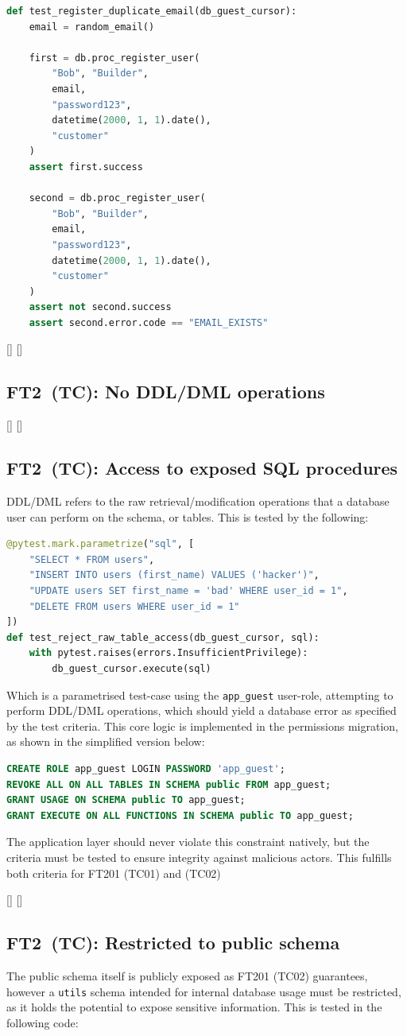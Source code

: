 \documentclass[journal]{IEEEtran}
\newcommand{\testcase}[4]{%
	\StrRight{00#2}{2}[\paddedminor]%
	\StrRight{00#3}{2}[\paddedid]%
	\vspace{-.5em}%
	\subsection*{\textsc{FT#1\paddedminor~(TC\paddedid):} #4}%
}
\begin{document}
	\begin{lstlisting}[language=Python]
def test_register_duplicate_email(db_guest_cursor):
	email = random_email()
	
	first = db.proc_register_user(
		"Bob", "Builder",
		email,
		"password123",
		datetime(2000, 1, 1).date(),
		"customer"
	)
	assert first.success
	
	second = db.proc_register_user(
		"Bob", "Builder",
		email,
		"password123",
		datetime(2000, 1, 1).date(),
		"customer"
	)
	assert not second.success
	assert second.error.code == "EMAIL_EXISTS"
	\end{lstlisting}
	
	\testcase{2}{1}{1}{No DDL/DML operations}
	\testcase{2}{1}{2}{Access to exposed SQL procedures}
	DDL/DML refers to the raw retrieval/modification operations that a database user can perform on the schema, or tables. This is tested by the following:
	
	\begin{lstlisting}[language=Python]
@pytest.mark.parametrize("sql", [
	"SELECT * FROM users",
	"INSERT INTO users (first_name) VALUES ('hacker')",
	"UPDATE users SET first_name = 'bad' WHERE user_id = 1",
	"DELETE FROM users WHERE user_id = 1"
])
def test_reject_raw_table_access(db_guest_cursor, sql):
	with pytest.raises(errors.InsufficientPrivilege):
		db_guest_cursor.execute(sql)
	\end{lstlisting}

	Which is a parametrised test-case using the \texttt{app\_guest} user-role, attempting to perform DDL/DML operations, which should yield a database error as specified by the test criteria. This core logic is implemented in the permissions migration, as shown in the simplified version below:
	
	\begin{lstlisting}[language=SQL]
CREATE ROLE app_guest LOGIN PASSWORD 'app_guest';
REVOKE ALL ON ALL TABLES IN SCHEMA public FROM app_guest;
GRANT USAGE ON SCHEMA public TO app_guest;
GRANT EXECUTE ON ALL FUNCTIONS IN SCHEMA public TO app_guest;
	\end{lstlisting}
	
	The application layer should never violate this constraint natively, but the criteria must be tested to ensure integrity against malicious actors. This fulfills both criteria for FT201 (TC01) and (TC02)
	
	\testcase{2}{2}{1}{Restricted to public schema}
	
	The public schema itself is publicly exposed as FT201 (TC02) guarantees, however a \texttt{utils} schema intended for internal database usage must be restricted, as it holds the potential to expose sensitive information. This is tested in the following code:
	
\end{document}
